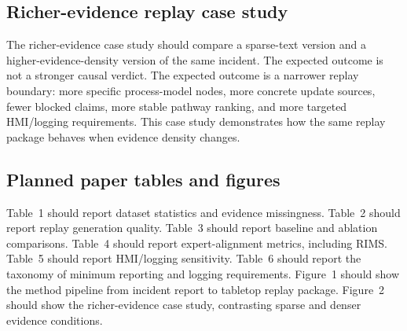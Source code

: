 \subsection{Richer-evidence replay case study}

The richer-evidence case study should compare a sparse-text version and a higher-evidence-density version of the same incident. The expected outcome is not a stronger causal verdict. The expected outcome is a narrower replay boundary: more specific process-model nodes, more concrete update sources, fewer blocked claims, more stable pathway ranking, and more targeted HMI/logging requirements. This case study demonstrates how the same replay package behaves when evidence density changes.

\subsection{Planned paper tables and figures}

Table~1 should report dataset statistics and evidence missingness. Table~2 should report replay generation quality. Table~3 should report baseline and ablation comparisons. Table~4 should report expert-alignment metrics, including RIMS. Table~5 should report HMI/logging sensitivity. Table~6 should report the taxonomy of minimum reporting and logging requirements. Figure~1 should show the method pipeline from incident report to tabletop replay package. Figure~2 should show the richer-evidence case study, contrasting sparse and denser evidence conditions.
